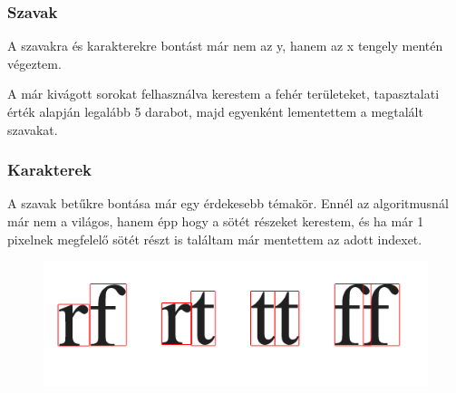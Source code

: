 \documentclass{beamer}
\begin{document}
\begin{frame}[fragile]
\frametitle{Szavak}

A szavakra és karakterekre bontást már nem az y, hanem az x tengely mentén végeztem.

\bigskip

A már kivágott sorokat felhasználva kerestem a fehér területeket, tapasztalati érték alapján legalább 5 darabot, majd egyenként lementettem a megtalált szavakat.

\end{frame}

\begin{frame}[fragile]
\frametitle{Karakterek}

A szavak betűkre bontása már egy érdekesebb témakör. Ennél az algoritmusnál már nem a világos, hanem épp hogy a sötét részeket kerestem, és ha már 1 pixelnek megfelelő sötét részt is találtam már mentettem az adott indexet.

\begin{figure}[!tbp]
  \centering
  \begin{minipage}[b]{0.45\textwidth}
    \includegraphics[width=\textwidth]{images/ligatura.png}
  \end{minipage}
\end{figure}

\end{frame}
\end{document}
